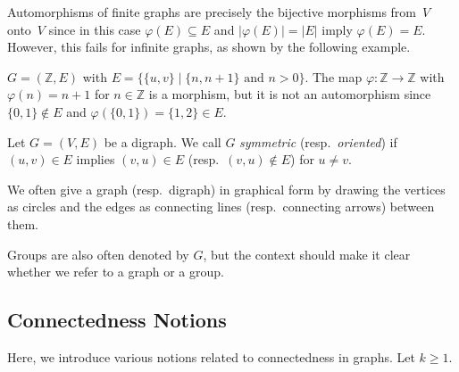 Automorphisms of finite graphs are precisely the bijective morphisms from~$V$ onto~$V$
since in this case $\varphi(E) \subseteq E$ and $|\varphi(E)| = |E|$ 
imply $\varphi(E) = E$. However, this fails for infinite graphs,
as shown by the following example.

\begin{example}
	$G = (\mathbb Z, E)$ with $E = \{ \{u,v\} \mid \{n,n+1\} \text{ and } n > 0 \}$.
	The map $\varphi \colon \mathbb Z \to \mathbb Z$
	with $\varphi(n) = n + 1$ for $n \in \mathbb Z$
	is a morphism, but it is not an automorphism since
	$\{0,1\} \notin E$ and $\varphi(\{0,1\}) = \{1,2\} \in E$.
\end{example}

Let $G = (V,E)$ be a digraph. We call $G$ \emph{symmetric} (resp.~\emph{oriented})
if $(u,v) \in E$ implies $(v,u) \in E$ (resp.~$(v,u) \notin E$) for $u \ne v$.

We often give a graph (resp.~digraph) in graphical form by drawing the vertices
as circles and the edges as connecting lines (resp.~connecting arrows)
between them.

Groups are also often denoted by $G$, but the context should make
it clear whether we refer to a graph or a group.

\subsection{Connectedness Notions} 
\label{prelim:sec:graphs:conn} 

Here, we introduce various notions related to connectedness in graphs. Let $k \ge 1$. 

